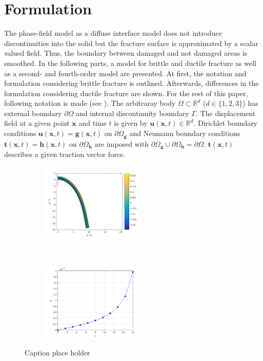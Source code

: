 \section{Formulation} \label{sec:formul}
The phase-field model as a diffuse interface model does not introduce discontinuities into the solid but the fracture surface is approximated by a scalar valued field. Thus, the boundary between damaged and not damaged areas is smoothed. In the following parts, a model for brittle and ductile fracture as well as a second- and fourth-order model are presented. At first, the notation and formulation considering brittle fracture is outlined. Afterwards, differences in the formulation considering ductile fracture are shown. For the rest of this paper, following notation is made (see ). The arbitraray body $\Omega\subset\mathbb{R}^{d}$ ($d\in\{1,2,3\}$) has external boundary $\partial\Omega$ and internal discontinuity boundary $\Gamma$. The displacement field at a given point $\mathbf{x}$ and time $t$ is given by $\mathbf{u}\left(\mathbf{x},t\right)\in\mathbb{R}^{d}$. Dirichlet boundary conditions $\mathbf{u}\left(\mathbf{x},t\right)=\mathbf{g}\left(\mathbf{x},t\right)$ on $\partial\Omega_{\mathbf{g}}$ and Neumann boundary conditions $\mathbf{t}\left(\mathbf{x},t\right)=\mathbf{h}\left(\mathbf{x},t\right)$ on $\partial\Omega_{\mathbf{h}}$ are imposed with $\partial\Omega_{\mathbf{g}}\cup\partial\Omega_{\mathbf{h}}=\partial\Omega$. $\mathbf{t}\left(\mathbf{x},t\right)$ describes a given traction vector force.

\begin{figure}[h]
    \centering
    \begin{subfigure}[t]{0.5\textwidth}
        \centering
        \includegraphics[width=5cm]{data/a}
        \caption{}\label{a}
    \end{subfigure}%
    ~ 
    \begin{subfigure}[t]{0.5\textwidth}
        \centering
        \includegraphics[width=5cm]{data/b}
        \caption{}\label{b}
    \end{subfigure}
    \caption{Caption place holder  } \label{fig}
\end{figure}
\\

